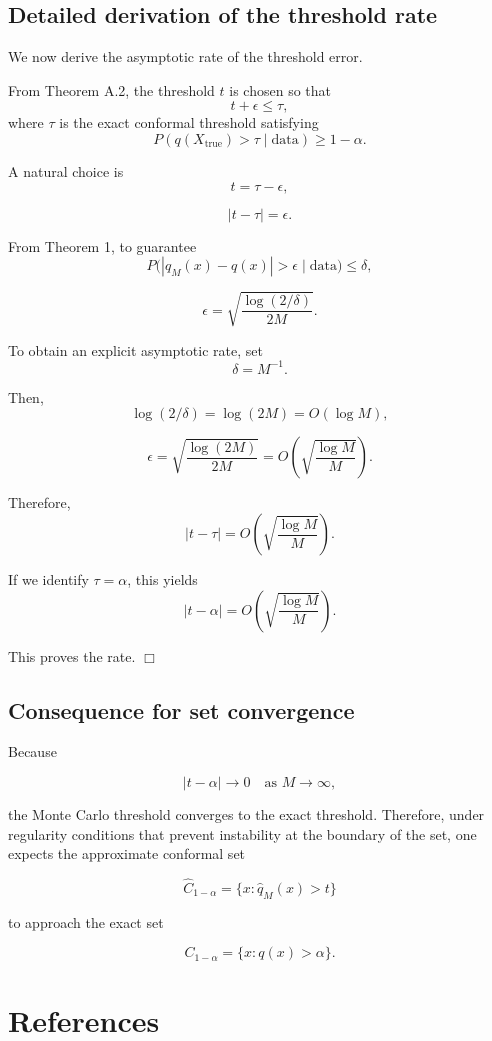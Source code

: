 \documentclass{article}
\begin{document}
\subsection{Detailed derivation of the threshold rate}

We now derive the asymptotic rate of the threshold error.

From Theorem A.2, the threshold $t$ is chosen so that
\[
t + \epsilon \le \tau,
\]
where $\tau$ is the exact conformal threshold satisfying
\[
P(q(X_{\text{true}}) > \tau \mid \text{data}) \ge 1 - \alpha.
\]

A natural choice is
\[
t = \tau - \epsilon,
\]

\[
|t - \tau| = \epsilon.
\]

From Theorem 1, to guarantee
\[
P\big(|\hat{q}_M(x) - q(x)| > \epsilon \mid \text{data}\big) \le \delta,
\]

\[
\epsilon = \sqrt{\frac{\log(2/\delta)}{2M}}.
\]

To obtain an explicit asymptotic rate, set
\[
\delta = M^{-1}.
\]

Then,
\[
\log(2/\delta) = \log(2M) = O(\log M),
\]

\[
\epsilon = \sqrt{\frac{\log(2M)}{2M}} = O\!\left(\sqrt{\frac{\log M}{M}}\right).
\]

Therefore,
\[
|t - \tau| = O\!\left(\sqrt{\frac{\log M}{M}}\right).
\]

If we identify $\tau = \alpha$, this yields
\[
|t - \alpha| = O\!\left(\sqrt{\frac{\log M}{M}}\right).
\]

This proves the rate. \hfill $\Box$

\subsection{Consequence for set convergence}

Because

\[
|t-\alpha|\to 0 \quad \text{as } M\to\infty,
\]

the Monte Carlo threshold converges to the exact threshold. Therefore, under regularity conditions that prevent instability at the boundary of the set, one expects the approximate conformal set

\[
\hat{C}_{1-\alpha}=\{x:\hat{q}_M(x)>t\}
\]

to approach the exact set

\[
C_{1-\alpha}=\{x:q(x)>\alpha\}.
\]

\section*{References}
\end{document}
